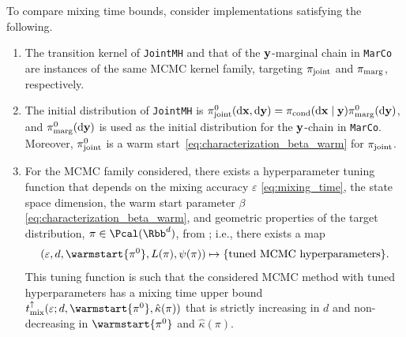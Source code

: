 \documentclass[onefignum,onetabnum]{siamonline250211}
\renewcommand{\d} {{\rm d}}                                %
\newcommand{\isocond}{\hat\kappa}
\newcommand{\bfx}{{\bf x}}
\newcommand{\bfy}{{\bf y}}
\newcommand{\pjoint}{\pi_{\rm joint}}
\newcommand{\pcond}{\pi_{\rm cond}}
\newcommand{\pmarg}{\pi_{\rm marg}}
\newcommand{\MarCo}{\textnormal{\texttt{MarCo}}\xspace}
\newcommand{\Joint}{\textnormal{\texttt{JointMH}}\xspace}
\begin{document}
\begin{assumption} \label{assump:mixing_time_comparison}
To compare mixing time bounds, consider implementations satisfying the following.
    \begin{enumerate}[label={\bfseries (B\arabic*)}, leftmargin=*]
        \item \label{assump:same_algorithm} The transition kernel of \Joint and that of the $\bfy$-marginal chain in \MarCo are instances of the same MCMC kernel family, targeting $\pjoint$ and $\pmarg$, respectively.
        \item \label{assump:initial_distribution} The initial distribution of \Joint is $\pjoint^0(\d\bfx, \d\bfy) = \pcond(\d\bfx \mid \bfy) \pmarg^0(\d\bfy)$,
            and $\pmarg^0(\d\bfy)$ is used as the initial distribution for the $\bfy$-chain in \MarCo.
            Moreover, $\pjoint^0$ is a warm start~\eqref{eq:characterization_beta_warm} for $\pjoint$.
    \item \label{assump:hyperpar_and_monotone_mixing_time} For the MCMC family considered, there exists a hyperparameter tuning function that depends on the mixing accuracy $\varepsilon$ \eqref{eq:mixing_time}, the state space dimension, the warm start parameter $\beta$ \eqref{eq:characterization_beta_warm}, and geometric properties of the target distribution, $\pi\in \Pcal(\Rbb^d)$, from ; i.e., there exists a map
    \begin{align*}\label{eq:hyperparameter_tuning}
	(\varepsilon,d,\warmstart{\pi^0}, L(\pi),\psi(\pi)) \mapsto \{\text{tuned MCMC hyperparameters}\}.
	\end{align*}
    This tuning function is such that the considered MCMC method with tuned hyperparameters has a mixing time upper bound $t_{\rm mix}^\uparrow(\varepsilon; d,\warmstart{\pi^0},\isocond(\pi))$ that is strictly increasing in $d$ and non-decreasing in $\warmstart{\pi^0}$ and $\isocond(\pi)$.
    \end{enumerate}
\end{assumption}
\end{document}
